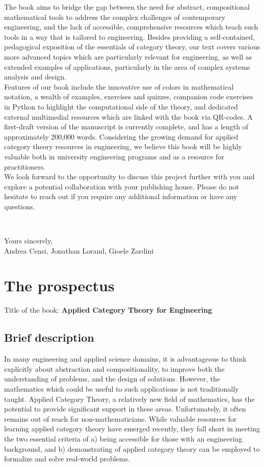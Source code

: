\documentclass[10pt, article, one side]{memoir}
\begin{document}
    The book aims to bridge the gap between the need for abstract, compositional mathematical tools to address the complex challenges of contemporary engineering, and the lack of accessible, comprehensive resources which teach such tools in a way that is tailored to engineering.
    Besides providing a self-contained, pedagogical exposition of the essentials of category theory, our text covers various more advanced topics which are particularly relevant for engineering, as well as extended examples of applications, particularly in the area of complex systems analysis and design.
    \\[-7pt]

    Features of our book include the innovative use of colors in mathematical notation, a wealth of examples, exercises and quizzes, companion code exercises in Python to highlight the computational side of the theory, and dedicated external multimedial resources which are linked with the book via QR-codes.
    A first-draft version of the manuscript is currently complete, and has a length of approximately 200,000 words.
    Considering the growing demand for applied category theory resources in engineering, we believe this book will be highly valuable both in university engineering programs and as a resource for practitioners.
    \\[-7pt]

    We look forward to the opportunity to discuss this project further with you and explore a potential collaboration with your publishing house.
    Please do not hesitate to reach out if you require any additional information or have any questions.

    \

    \noindent Yours sincerely,\\

    \noindent \hspace{8cm}
    Andrea Censi, Jonathan Lorand, Gioele Zardini

    \newpage

    \chapter{The prospectus}
    Title of the book: \textbf{Applied Category Theory for Engineering}
    \section{Brief description}
    In many engineering and applied science domains, it is advantageous to think explicitly about abstraction and compositionality, to improve both the understanding of problems, and the design of solutions.
    However, the mathematics which could be useful to such applications is not traditionally taught.
    Applied Category Theory, a relatively new field of mathematics, has the potential to provide significant support in these areas.
    Unfortunately, it often remains out of reach for non-mathematicians.
    While valuable resources for learning applied category theory have emerged recently, they fall short in meeting the two essential criteria of a) being accessible for those with an engineering background, and b) demonstrating of applied category theory can be employed to formalize and solve real-world problems.
\end{document}
